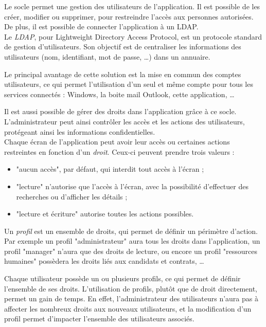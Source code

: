 
Le socle permet une gestion des utilisateurs de l'application.
Il est possible de les créer, modifier ou supprimer, pour restreindre l'accès aux personnes autorisées.
De plus, il est possible de connecter l'application à un LDAP.
\\

Le \textit{LDAP}, pour Lightweight Directory Access Protocol, est un protocole standard de gestion d'utilisateurs.
Son objectif est de centraliser les informations des utilisateurs (nom, identifiant, mot de passe, \ldots) dans un annuaire.

Le principal avantage de cette solution est la mise en commun des comptes utilisateurs, ce qui permet l'utilisation d'un seul et même compte pour tous les services connectés : Windows, la boite mail Outlook, cette application, \ldots


\label{Gestion des droits}

Il est aussi possible de gérer des droits dans l'application grâce à ce socle.
L'administrateur peut ainsi contrôler les accès et les actions des utilisateurs, protégeant ainsi les informations confidentielles.
\\

Chaque écran de l'application peut avoir leur accès ou certaines actions restreintes en fonction d'un \textit{droit}.
Ceux-ci peuvent prendre trois valeurs : 
\begin{itemize}
	\item "aucun accès", par défaut, qui interdit tout accès à l'écran ;
	\item "lecture" n'autorise que l'accès à l'écran, avec la possibilité d'effectuer des recherches ou d'afficher les détails ;
	\item "lecture et écriture" autorise toutes les actions possibles.
\end{itemize}

Un \textit{profil} est un ensemble de droits, qui permet de définir un périmètre d'action.
Par exemple un profil "administrateur" aura tous les droits dans l'application, un profil "manager" n'aura que des droits de lecture, ou encore un profil "ressources humaines" possèdera les droits liés aux candidats et contrats, \ldots

Chaque utilisateur possède un ou plusieurs profils, ce qui permet de définir l'ensemble de ses droits.
L'utilisation de profils, plutôt que de droit directement, permet un gain de temps.
En effet, l'administrateur des utilisateurs n'aura pas à affecter les nombreux droits aux nouveaux utilisateurs, et la modification d'un profil permet d'impacter l'ensemble des utilisateurs associés.
\\

